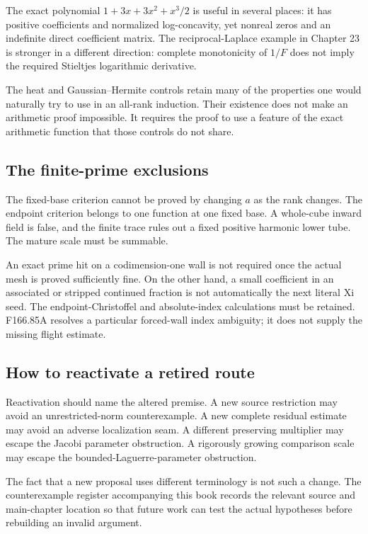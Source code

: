 \documentclass[
  10pt,
  a4paper,
  10pt,
  oneside,
  openany]{book}
\begin{document}
The exact polynomial \(1+3x+3x^2+x^3/2\) is useful in several places: it
has positive coefficients and normalized log-concavity, yet nonreal
zeros and an indefinite direct coefficient matrix. The
reciprocal-Laplace example in Chapter 23 is stronger in a different
direction: complete monotonicity of \(1/F\) does not imply the required
Stieltjes logarithmic derivative.

The heat and Gaussian--Hermite controls retain many of the properties
one would naturally try to use in an all-rank induction. Their existence
does not make an arithmetic proof impossible. It requires the proof to
use a feature of the exact arithmetic function that those controls do
not share.

\subsection{The finite-prime
exclusions}\label{the-finite-prime-exclusions}

The fixed-base criterion cannot be proved by changing \(a\) as the rank
changes. The endpoint criterion belongs to one function at one fixed
base. A whole-cube inward field is false, and the finite trace rules out
a fixed positive harmonic lower tube. The mature scale must be summable.

An exact prime hit on a codimension-one wall is not required once the
actual mesh is proved sufficiently fine. On the other hand, a small
coefficient in an associated or stripped continued fraction is not
automatically the next literal Xi seed. The endpoint-Christoffel and
absolute-index calculations must be retained. F166.85A resolves a
particular forced-wall index ambiguity; it does not supply the missing
flight estimate.

\subsection{How to reactivate a retired
route}\label{how-to-reactivate-a-retired-route}

Reactivation should name the altered premise. A new source restriction
may avoid an unrestricted-norm counterexample. A new complete residual
estimate may avoid an adverse localization seam. A different preserving
multiplier may escape the Jacobi parameter obstruction. A rigorously
growing comparison scale may escape the bounded-Laguerre-parameter
obstruction.

The fact that a new proposal uses different terminology is not such a
change. The counterexample register accompanying this book records the
relevant source and main-chapter location so that future work can test
the actual hypotheses before rebuilding an invalid argument.
\end{document}
